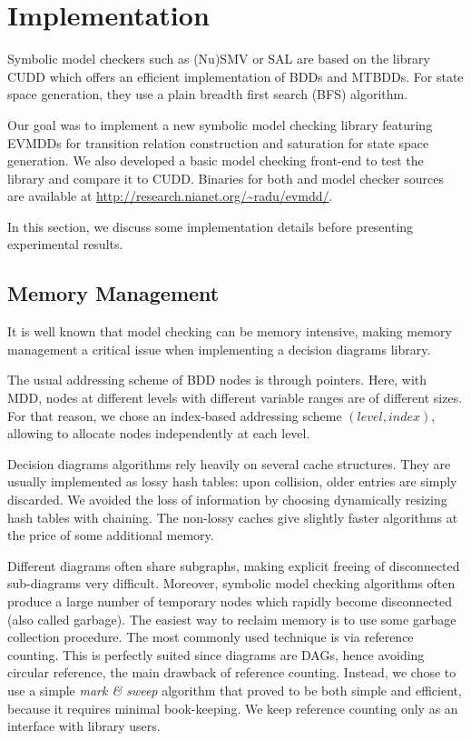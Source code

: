\documentclass[nocover]             %
{NASA}                       %
\begin{document}

\section{Implementation}

Symbolic model checkers such as (Nu)SMV\cite{NuSMV} or SAL\cite{SAL}
are based on the library CUDD\cite{CUDD} which offers an efficient
implementation of BDDs and MTBDDs. For state space generation, they
use a plain breadth first search (BFS) algorithm.

Our goal was to implement a new symbolic model checking library featuring
EVMDDs for transition relation construction and saturation\cite{Saturation2001}
for state space generation. We also developed a basic
model checking front-end to test the library and compare it to CUDD.
Binaries for both and model checker sources are available
at \url{http://research.nianet.org/~radu/evmdd/}.

In this section, we discuss some implementation details
before presenting experimental results.

\subsection{Memory Management}

It is well known that model checking can be memory intensive,
making memory management a critical issue when implementing
a decision diagrams library.

The usual addressing scheme of BDD nodes is through pointers.
Here, with MDD, nodes at different levels with different
variable ranges are of different sizes. For that reason, we chose
an index-based addressing scheme $(level, index)$, allowing to allocate nodes
independently at each level.

Decision diagrams algorithms rely heavily on several cache structures.
They are usually implemented as lossy hash tables: upon collision, older entries
are simply discarded. 
We avoided the loss of information by choosing dynamically resizing hash tables with chaining.
The non-lossy caches give slightly faster algorithms at the price
of some additional memory.

Different diagrams often share subgraphs, making explicit freeing
of disconnected sub-diagrams very difficult. Moreover,
symbolic model checking algorithms often produce a large number of temporary
nodes which rapidly become disconnected (also called garbage). 
The easiest way to reclaim
memory is to use some garbage collection procedure.
The most commonly used technique is via reference counting.
This is perfectly suited since diagrams are DAGs, hence avoiding
circular reference, the main drawback of reference counting. 
Instead, we chose to use a simple \emph{mark \& sweep} algorithm that proved
to be both simple and efficient, because it requires minimal book-keeping.
We keep reference counting only as an interface with library users.
\end{document}
